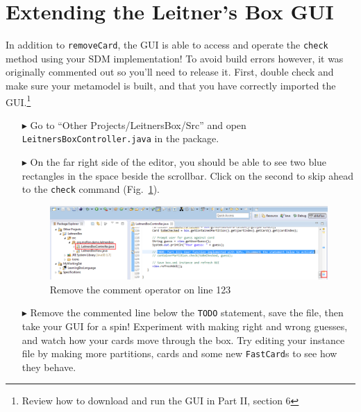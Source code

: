 \newpage
\hypertarget{sec:extendGui}{}
\section{Extending the Leitner's Box GUI}
\genHeader

\vspace{0.5cm}

In addition to \texttt{removeCard}, the GUI is able to access and operate the \texttt{check} method using your SDM implementation! To avoid build errors
however, it was originally commented out so you'll need to release it. First, double check and make sure your metamodel is built, and that you have correctly
imported the GUI.\footnote{Review how to download and run the GUI in Part II, section 6}

\begin{itemize}

\item[$\blacktriangleright$] Go to ``Other Projects/LeitnersBox/Src'' and open \texttt{Leitners\-Box\-Cont\-roller\-.java} in the package.

\vspace{0.5cm}

\item[$\blacktriangleright$] On the far right side of the editor, you should be able to see two blue rectangles in the space beside the scrollbar. Click on the
second to skip ahead to the \texttt{check} command (Fig.~\ref{fig:remComment}).

\vspace{0.5cm}

\begin{figure}[htp]
\begin{center}
  \includegraphics[width=\textwidth]{eclipse_GUICommentLine}
  \caption{Remove the comment operator on line 123}
  \label{fig:remComment}
\end{center}
\end{figure}

\vspace{0.5cm}

\item[$\blacktriangleright$] Remove the commented line below the \texttt{TODO} statement, save the file, then take your GUI for a spin! Experiment with
making right and wrong guesses, and watch how your cards move through the box. Try editing your instance file by making more partitions, cards and some
new \texttt{FastCard}s to see how they behave.

\end{itemize}
